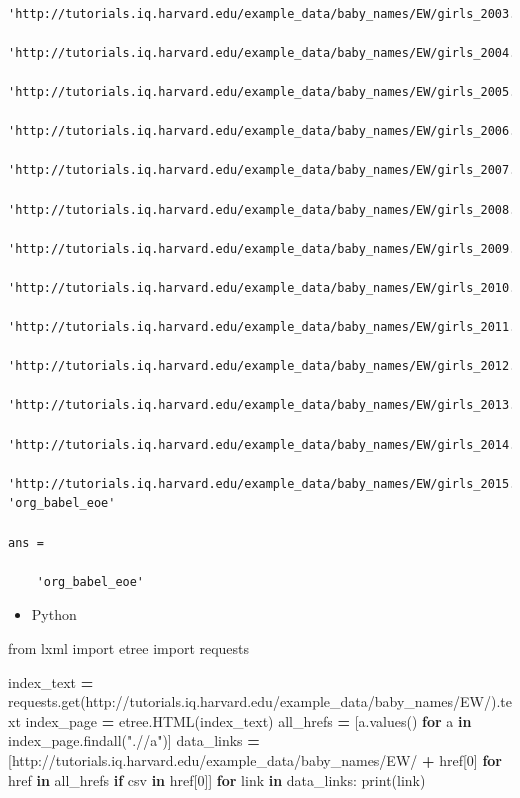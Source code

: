 \documentclass[
]{book}
\newenvironment{Shaded}{\begin{snugshade}}{\end{snugshade}}
\newcommand{\BuiltInTok}[1]{#1}
\newcommand{\ControlFlowTok}[1]{\textcolor[rgb]{0.13,0.29,0.53}{\textbf{#1}}}
\newcommand{\DecValTok}[1]{\textcolor[rgb]{0.00,0.00,0.81}{#1}}
\newcommand{\ImportTok}[1]{#1}
\newcommand{\KeywordTok}[1]{\textcolor[rgb]{0.13,0.29,0.53}{\textbf{#1}}}
\newcommand{\NormalTok}[1]{#1}
\newcommand{\OperatorTok}[1]{\textcolor[rgb]{0.81,0.36,0.00}{\textbf{#1}}}
\newcommand{\StringTok}[1]{\textcolor[rgb]{0.31,0.60,0.02}{#1}}
\providecommand{\tightlist}{%
  \setlength{\itemsep}{0pt}\setlength{\parskip}{0pt}}
\begin{document}
\begin{verbatim}
    'http://tutorials.iq.harvard.edu/example_data/baby_names/EW/girls_2003.csv'
    'http://tutorials.iq.harvard.edu/example_data/baby_names/EW/girls_2004.csv'
    'http://tutorials.iq.harvard.edu/example_data/baby_names/EW/girls_2005.csv'
    'http://tutorials.iq.harvard.edu/example_data/baby_names/EW/girls_2006.csv'
    'http://tutorials.iq.harvard.edu/example_data/baby_names/EW/girls_2007.csv'
    'http://tutorials.iq.harvard.edu/example_data/baby_names/EW/girls_2008.csv'
    'http://tutorials.iq.harvard.edu/example_data/baby_names/EW/girls_2009.csv'
    'http://tutorials.iq.harvard.edu/example_data/baby_names/EW/girls_2010.csv'
    'http://tutorials.iq.harvard.edu/example_data/baby_names/EW/girls_2011.csv'
    'http://tutorials.iq.harvard.edu/example_data/baby_names/EW/girls_2012.csv'
    'http://tutorials.iq.harvard.edu/example_data/baby_names/EW/girls_2013.csv'
    'http://tutorials.iq.harvard.edu/example_data/baby_names/EW/girls_2014.csv'
    'http://tutorials.iq.harvard.edu/example_data/baby_names/EW/girls_2015.csv'
'org_babel_eoe'

ans =

    'org_babel_eoe'
\end{verbatim}

\begin{itemize}
\tightlist
\item
  Python
\end{itemize}

\begin{Shaded}
\begin{Highlighting}[]
\ImportTok{from}\NormalTok{ lxml }\ImportTok{import}\NormalTok{ etree}
\ImportTok{import}\NormalTok{ requests}

\NormalTok{index\_text }\OperatorTok{=}\NormalTok{ requests.get(}\StringTok{\textquotesingle{}http://tutorials.iq.harvard.edu/example\_data/baby\_names/EW/\textquotesingle{}}\NormalTok{).text}
\NormalTok{index\_page }\OperatorTok{=}\NormalTok{ etree.HTML(index\_text)}
\NormalTok{all\_hrefs }\OperatorTok{=}\NormalTok{ [a.values() }\ControlFlowTok{for}\NormalTok{ a }\KeywordTok{in}\NormalTok{ index\_page.findall(}\StringTok{".//a"}\NormalTok{)]}
\NormalTok{data\_links }\OperatorTok{=}\NormalTok{ [}\StringTok{\textquotesingle{}http://tutorials.iq.harvard.edu/example\_data/baby\_names/EW/\textquotesingle{}} \OperatorTok{+}
\NormalTok{              href[}\DecValTok{0}\NormalTok{] }\ControlFlowTok{for}\NormalTok{ href }\KeywordTok{in}\NormalTok{ all\_hrefs }\ControlFlowTok{if} \StringTok{\textquotesingle{}csv\textquotesingle{}} \KeywordTok{in}\NormalTok{ href[}\DecValTok{0}\NormalTok{]]}
\ControlFlowTok{for}\NormalTok{ link }\KeywordTok{in}\NormalTok{ data\_links:}
    \BuiltInTok{print}\NormalTok{(link)}
\end{Highlighting}
\end{Shaded}
\end{document}
